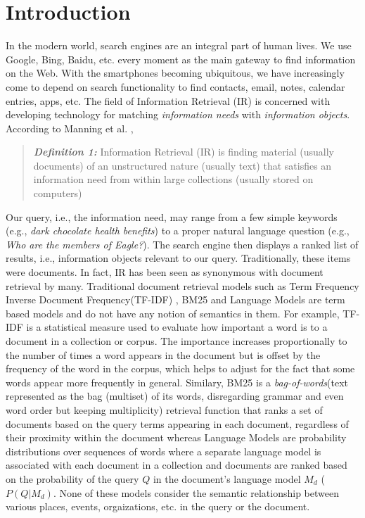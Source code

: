 \documentclass{article}
\begin{document}
\section{Introduction}
\label{sec:introduction}

In the modern world, search engines are an integral part of human lives. We use Google, Bing, Baidu, etc. every moment as the main gateway to find information on the Web. %
With the smartphones becoming ubiquitous, we have increasingly come to depend on search functionality to find contacts, email, notes, calendar entries, apps, etc.  
The field of Information Retrieval (IR) is concerned with developing technology for matching \textit{information needs} with \textit{information objects}. According to Manning et al. \cite{Manning:2008:IIR:1394399}, 
\begin{quote}
    \textit{\textbf{Definition 1:}} Information Retrieval (IR) is finding material (usually documents) of an unstructured nature (usually text) that satisfies an information need from within large collections (usually stored on computers)
\end{quote}
Our query, i.e., the information need, may range from a few simple keywords (e.g., \textit{dark chocolate health benefits}) to a proper natural language question (e.g., \textit{Who are the members of Eagle?}). The search engine then displays a ranked list of results, i.e., information objects relevant to our query. Traditionally, these items were documents. In fact, IR has been seen as synonymous with document retrieval by many. Traditional document retrieval models such as  Term Frequency Inverse Document Frequency(TF-IDF) \cite{jones1988, salton1988term,robertson1976relevance,croft1979using,papineni2001inverse}, BM25 \cite{jones2000probabilistic} and Language Models \cite{ponte1998language} are term based models and do not have any notion of semantics in them. For example, TF-IDF is a statistical measure used to evaluate how important a word is to a document in a collection or corpus. The importance increases proportionally to the number of times a word appears in the document but is offset by the frequency of the word in the corpus, which helps to adjust for the fact that some words appear more frequently in general. Similary, BM25 is a \textit{bag-of-words}(text represented as the bag (multiset) of its words, disregarding grammar and even word order but keeping multiplicity) retrieval function that ranks a set of documents based on the query terms appearing in each document, regardless of their proximity within the document whereas Language Models are probability distributions over sequences of words where a separate language model is associated with each document in a collection and documents are ranked based on the probability of the query $Q$ in the document's language model $M_d$ ($P(Q \vert M_d)$. None of these models consider the semantic relationship between various places, events, orgaizations, etc. in the query or the document.
\end{document}
